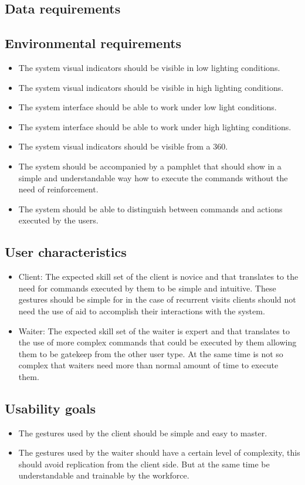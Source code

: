 \documentclass{article}
\begin{document}
\subsection{Data requirements}
\subsection{Environmental requirements}
\begin{itemize}
    \item The system visual indicators should be visible in low lighting conditions.
    \item The system visual indicators should be visible in high lighting conditions.
    \item The system interface should be able to work under low light conditions.
    \item The system interface should be able to work under high lighting conditions.
    \item The system visual indicators should be visible from a 360.
    \item The system should be accompanied by a pamphlet that should show in a simple and understandable way how to execute the commands without the need of reinforcement.
    \item The system should be able to distinguish between commands and actions executed by the users.
\end{itemize}
\subsection{User characteristics}
\begin{itemize}
    \item Client: The expected skill set of the client is novice and that translates to the need for commands executed by them to be simple and intuitive. These gestures should be simple for in the case of recurrent visits clients should not need the use of aid to accomplish their interactions with the system.
    \item Waiter: The expected skill set of the waiter is expert and that translates to the use of more complex commands that could be executed by them allowing them to be gatekeep from the other user type. At the same time is not so complex that waiters need more than normal amount of time to execute them.
\end{itemize}
\subsection{Usability goals}
\begin{itemize}
    \item The gestures used by the client should be simple and easy to master.
    \item The gestures used by the waiter should have a certain level of complexity, this should avoid replication from the client side. But at the same time be understandable and trainable by the workforce.
\end{itemize}
\end{document}
